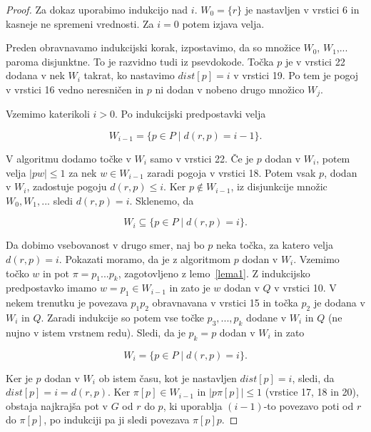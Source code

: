 \documentclass[a4paper, 12pt]{book}
\begin{document}
\begin{proof}
Za dokaz uporabimo indukcijo nad $i$. $W_0 = \{r\}$ je nastavljen v vrstici 6 in kasneje ne spremeni vrednosti. Za $i = 0$ potem izjava velja.

Preden obravnavamo indukcijski korak, izpostavimo, da so množice $W_0$, $W_1$,... paroma disjunktne. To je razvidno tudi iz psevdokode. Točka $p$  je v vrstici 22 dodana v nek $W_i$ takrat, ko nastavimo $dist[p] = i$ v vrstici 19. Po tem je pogoj v vrstici 16 vedno neresničen in $p$ ni dodan v nobeno drugo množico $W_j$.

Vzemimo katerikoli $i > 0$. Po indukcijski predpostavki velja

\begin{equation*}
W_{i-1} = \{p \in P \mid d(r,p) = i - 1\}.
\end{equation*}

V algoritmu dodamo točke v $W_i$ samo v vrstici 22. Če je $p$ dodan v $W_i$, potem velja $|pw| \leq 1$ za nek $w \in W_{i-1}$ zaradi pogoja v vrstici 18. Potem vsak $p$, dodan v $W_i$, zadostuje pogoju $d(r,p) \leq i$. Ker $p \notin W_{i-1}$, iz disjunkcije množic $W_0, W_1,...$ sledi $d(r,p) = i$. Sklenemo, da

\begin{equation*}
W_i \subseteq \{p \in P \mid d(r,p) = i\}.
\end{equation*}

Da dobimo vsebovanost v drugo smer, naj bo $p$ neka točka, za katero velja $d(r,p) = i$. Pokazati moramo, da je z algoritmom $p$ dodan v $W_i$. Vzemimo točko $w$ in pot $\pi = p_1...p_k$, zagotovljeno z lemo~\ref{lema1}. Z indukcijsko predpostavko imamo $w = p_1 \in W_{i-1}$ in zato je $w$ dodan v $Q$ v vrstici 10. V nekem trenutku je povezava $p_1p_2$ obravnavana v vrstici 15 in točka $p_2$ je dodana v $W_i$ in $Q$. Zaradi indukcije so potem vse točke $p_3,...,p_k$ dodane v $W_i$ in $Q$ (ne nujno v istem vrstnem redu). Sledi, da je $p_k = p$ dodan v $W_i$ in zato

\begin{equation*}
W_i = \{p \in P \mid d(r,p) = i \}.
\end{equation*}

Ker je $p$ dodan v $W_i$ ob istem času, kot je nastavljen $dist[p] = i$, sledi, da $dist[p] = i = d(r,p)$. Ker $\pi[p] \in W_{i-1}$ in $|p\pi[p] | \leq 1$ (vrstice 17, 18 in 20), obstaja najkrajša pot v $G$ od $r$ do $p$, ki uporablja $(i-1)$-to povezavo poti od $r$ do $\pi[p]$, po indukciji pa ji sledi povezava $\pi[p]p$.
\end{proof}
\end{document}
